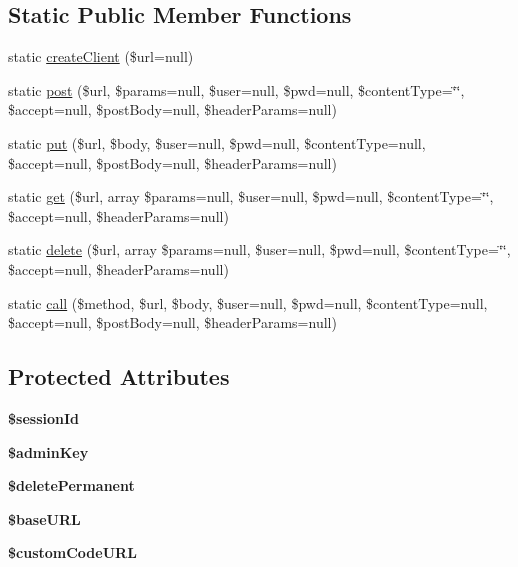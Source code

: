 \subsection*{Static Public Member Functions}
\begin{DoxyCompactItemize}
\item 
static \hyperlink{class_rest_client_a2464ad4c766c4e604aacacf1a8d6fadb}{create\+Client} (\$url=null)
\item 
static \hyperlink{class_rest_client_ab83e8ddc9faf66e2d18484ed8c1d8d48}{post} (\$url, \$params=null, \$user=null, \$pwd=null, \$content\+Type=\char`\"{}\char`\"{}, \$accept=null, \$post\+Body=null, \$header\+Params=null)
\item 
static \hyperlink{class_rest_client_a73223d3b21f3ee1c7e77b056feb39a5d}{put} (\$url, \$body, \$user=null, \$pwd=null, \$content\+Type=null, \$accept=null, \$post\+Body=null, \$header\+Params=null)
\item 
static \hyperlink{class_rest_client_a2cc0221362a6d2d49f8bd2dc96879c6e}{get} (\$url, array \$params=null, \$user=null, \$pwd=null, \$content\+Type=\char`\"{}\char`\"{}, \$accept=null, \$header\+Params=null)
\item 
static \hyperlink{class_rest_client_aad52c04b3af8a7d3232013daa739e053}{delete} (\$url, array \$params=null, \$user=null, \$pwd=null, \$content\+Type=\char`\"{}\char`\"{}, \$accept=null, \$header\+Params=null)
\item 
static \hyperlink{class_rest_client_a787d81e117ef8f8f3561a5b866697c64}{call} (\$method, \$url, \$body, \$user=null, \$pwd=null, \$content\+Type=null, \$accept=null, \$post\+Body=null, \$header\+Params=null)
\end{DoxyCompactItemize}
\subsection*{Protected Attributes}
\begin{DoxyCompactItemize}
\item 
\hypertarget{class_rest_client_a6bb2ea848560b3d375a0a55bdd13ffa1}{{\bfseries \$session\+Id}}\label{class_rest_client_a6bb2ea848560b3d375a0a55bdd13ffa1}

\item 
\hypertarget{class_rest_client_acfbac27769056acea55463dcc851093a}{{\bfseries \$admin\+Key}}\label{class_rest_client_acfbac27769056acea55463dcc851093a}

\item 
\hypertarget{class_rest_client_a6eb1f038eec16e1e0fd0f3624619429f}{{\bfseries \$delete\+Permanent}}\label{class_rest_client_a6eb1f038eec16e1e0fd0f3624619429f}

\item 
\hypertarget{class_rest_client_ae91e634b1fa0ad6e2ee3928982cbda2a}{{\bfseries \$base\+U\+R\+L}}\label{class_rest_client_ae91e634b1fa0ad6e2ee3928982cbda2a}

\item 
\hypertarget{class_rest_client_a3eb4f000d34e4eb97322958be1bf86f6}{{\bfseries \$custom\+Code\+U\+R\+L}}\label{class_rest_client_a3eb4f000d34e4eb97322958be1bf86f6}

\end{DoxyCompactItemize}


